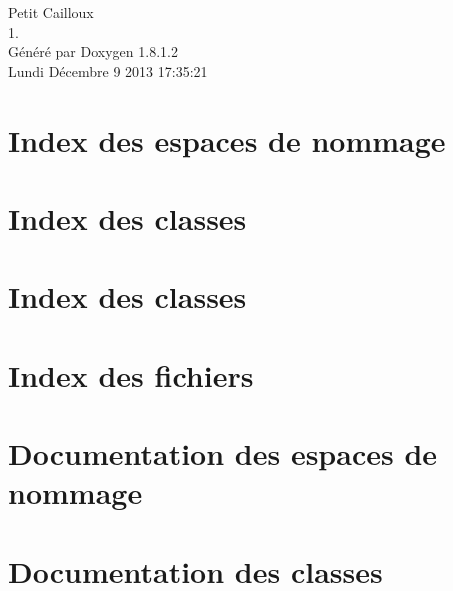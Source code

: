 \documentclass{book}
\begin{document}
\hypersetup{pageanchor=false,citecolor=blue}
\begin{titlepage}
\vspace*{7cm}
\begin{center}
{\Large Petit Cailloux \\[1ex]\large 1. }\\
\vspace*{1cm}
{\large Généré par Doxygen 1.8.1.2}\\
\vspace*{0.5cm}
{\small Lundi Décembre 9 2013 17:35:21}\\
\end{center}
\end{titlepage}
\clearemptydoublepage
{}
\tableofcontents
\clearemptydoublepage
{}
\hypersetup{pageanchor=true,citecolor=blue}
\chapter{Index des espaces de nommage}

\chapter{Index des classes}

\chapter{Index des classes}

\chapter{Index des fichiers}

\chapter{Documentation des espaces de nommage}











\chapter{Documentation des classes}











\end{document}
